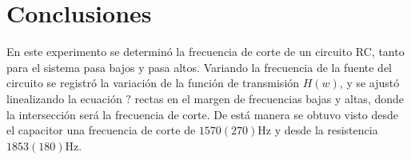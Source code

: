 \section{Conclusiones}
En este experimento se determinó la frecuencia de corte de un circuito RC, tanto para el sistema pasa bajos y pasa altos. Variando la frecuencia de la fuente del circuito se registró la variación de la función de transmisión \(H(w)\), y se ajustó linealizando la ecuación \(?\) rectas en el margen de frecuencias bajas y altas, donde la intersección será la frecuencia de corte. De está manera se obtuvo visto desde el capacitor una frecuencia de corte de $1570(270)$Hz y desde la resistencia \( 1853(180)\)Hz. 